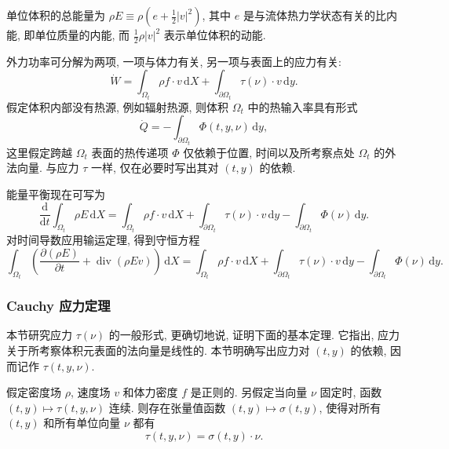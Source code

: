 单位体积的总能量为 $\rho E\equiv\rho(e+\tfrac12|v|^2)$, 其中 $e$ 是与流体热力学状态有关的比内能, 即单位质量的内能, 而 $\tfrac12\rho|v|^2$ 表示单位体积的动能.

外力功率可分解为两项, 一项与体力有关, 另一项与表面上的应力有关:
\[
  \dot W=\int_{\Omega_t}\rho f\cdot v\,\mathrm{d}X
  +\int_{\partial\Omega_t}\tau(\nu)\cdot v\,\mathrm{d}y.
\]
假定体积内部没有热源, 例如辐射热源, 则体积 $\Omega_t$ 中的热输入率具有形式
\[
  \dot Q=-\int_{\partial\Omega_t}\Phi(t,y,\nu)\,\mathrm{d}y,
\]
这里假定跨越 $\Omega_t$ 表面的热传递项 $\Phi$ 仅依赖于位置, 时间以及所考察点处 $\Omega_t$ 的外法向量. 与应力 $\tau$ 一样, 仅在必要时写出其对 $(t,y)$ 的依赖.

能量平衡现在可写为
\[
  \frac{\mathrm{d}}{\mathrm{d}t}\int_{\Omega_t}\rho E\,\mathrm{d}X
  =\int_{\Omega_t}\rho f\cdot v\,\mathrm{d}X
  +\int_{\partial\Omega_t}\tau(\nu)\cdot v\,\mathrm{d}y
  -\int_{\partial\Omega_t}\Phi(\nu)\,\mathrm{d}y.
\]
对时间导数应用输运定理, 得到守恒方程
\begin{equation}
\label{eq:chap1-energy-integral}
  \int_{\Omega_t}\left(\frac{\partial(\rho E)}{\partial t}+\operatorname{div}(\rho E v)\right)\,\mathrm{d}X
  =\int_{\Omega_t}\rho f\cdot v\,\mathrm{d}X
  +\int_{\partial\Omega_t}\tau(\nu)\cdot v\,\mathrm{d}y
  -\int_{\partial\Omega_t}\Phi(\nu)\,\mathrm{d}y.
\end{equation}

\subsubsection{Cauchy 应力定理}
\label{subsec:chap1-cauchy-stress}

本节研究应力 $\tau(\nu)$ 的一般形式, 更确切地说, 证明下面的基本定理. 它指出, 应力关于所考察体积元表面的法向量是线性的. 本节明确写出应力对 $(t,y)$ 的依赖, 因而记作 $\tau(t,y,\nu)$.

\begin{Theorem}
\label{thm:chap1-cauchy-stress}
假定密度场 $\rho$, 速度场 $v$ 和体力密度 $f$ 是正则的. 另假定当向量 $\nu$ 固定时, 函数 $(t,y)\mapsto\tau(t,y,\nu)$ 连续. 则存在张量值函数 $(t,y)\mapsto\sigma(t,y)$, 使得对所有 $(t,y)$ 和所有单位向量 $\nu$ 都有
\[
  \tau(t,y,\nu)=\sigma(t,y)\cdot\nu.
\]
\end{Theorem}

